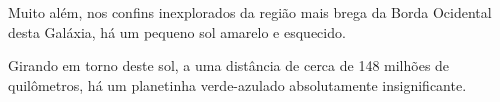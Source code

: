 \documentclass{minimal}
\begin{document}
  Muito além, nos confins inexplorados da região mais brega da
  Borda Ocidental desta Galáxia, há um pequeno sol amarelo e esquecido.

  Girando em torno deste sol, a uma distância de cerca de 148 milhões de
  quilômetros, há um planetinha verde-azulado absolutamente insignificante.
\end{document}
